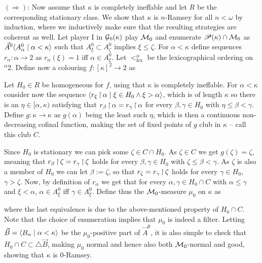 \documentclass[../../main]{subfiles}
\begin{document}
{	\qquad $(\Rightarrow)$: Now assume that $\kappa$ is completely ineffable and let $R$ be the corresponding stationary class. We show that $\kappa$ is $n$-Ramsey for all $n<\omega$ by induction, where we inductively make sure that the resulting strategies are coherent as well. Let player I in $\operatorname{\mathcal G}_0(\kappa)$ play $\operatorname{\mathcal M}_0$ and enumerate $\mathscr P(\kappa)\cap\operatorname{\mathcal M}_0$ as $\vec A^0\langle A^0_\alpha\mid\alpha<\kappa\rangle$ such that $A^0_\xi\subset A^0_\zeta$ implies $\xi\leq\zeta$. For $\alpha<\kappa$ define sequences $r_\alpha:\alpha\to 2$ as $r_\alpha(\xi)=1$ iff $\alpha\in A^0_\xi$. Let $<_{\text{lex}}^\alpha$ be the lexicographical ordering on $^\alpha 2$. Define now a colouring $f:[\kappa]^2\to 2$ as

	Let $H_0\in R$ be homogeneous for $f$, using that $\kappa$ is completely ineffable. For $\alpha<\kappa$ consider now the sequence $\langle r_\xi\operatorname{\upharpoonright}\alpha\mid\xi\in H_0\land\xi>\alpha\rangle$, which is of length $\kappa$ so there is an $\eta\in[\alpha,\kappa)$ satisfying that $r_\beta\operatorname{\upharpoonright}\alpha=r_\gamma\operatorname{\upharpoonright}\alpha$ for every $\beta,\gamma\in H_0$ with $\eta\leq\beta<\gamma$. Define $g:\kappa\to\kappa$ as $g(\alpha)$ being the least such $\eta$, which is then a continuous non-decreasing cofinal function, making the set of fixed points of $g$ club in $\kappa$ -- call this club $C$.

	\qquad Since $H_0$ is stationary we can pick some $\zeta\in C\cap H_0$. As $\zeta\in C$ we get $g(\zeta)=\zeta$, meaning that $r_\beta\operatorname{\upharpoonright}\zeta=r_\gamma\operatorname{\upharpoonright}\zeta$ holds for every $\beta,\gamma\in H_0$ with $\zeta\leq\beta<\gamma$. As $\zeta$ is also a member of $H_0$ we can let $\beta:=\zeta$, so that $r_\zeta=r_\gamma\operatorname{\upharpoonright}\zeta$ holds for every $\gamma\in H_0$, $\gamma>\zeta$.	Now, by definition of $r_\alpha$ we get that for every $\alpha,\gamma\in H_0\cap C$ with $\alpha\leq\gamma$ and $\xi<\alpha$, $\alpha\in A^0_\xi$ iff $\gamma\in A^0_\xi$. Define thus the $\operatorname{\mathcal M}_0$-measure $\mu_0$ on $\kappa$ as

	where the last equivalence is due to the above-mentioned property of $H_0\cap C$. Note that the choice of enumeration implies that $\mu_0$ is indeed a filter. Letting $\vec B=\langle B_\alpha\mid\alpha<\kappa\rangle$ be the $\mu_0$-positive part of $\vec A^0$, it is also simple to check that $H_0\cap C\subset\triangle\vec B$, making $\mu_0$ normal and hence also both $\operatorname{\mathcal M}_0$-normal and good, showing that $\kappa$ is $0$-Ramsey.

}
\end{document}
